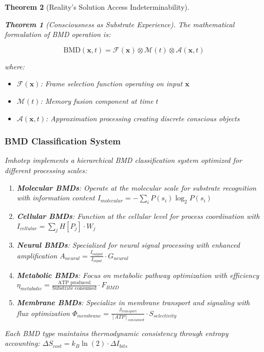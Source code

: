 \documentclass[12pt,a4paper]{article}
\newtheorem{theorem}{Theorem}[section]
\theoremstyle{remark}
\begin{document}
\begin{theorem}[Reality's Solution Access Indeterminability]
\begin{theorem}[Consciousness as Substrate Experience]
The mathematical formulation of BMD operation is:

\begin{equation}
\text{BMD}(\mathbf{x}, t) = \mathcal{F}(\mathbf{x}) \otimes \mathcal{M}(t) \otimes \mathcal{A}(\mathbf{x}, t)
\end{equation}

where:
\begin{itemize}
\item $\mathcal{F}(\mathbf{x})$: Frame selection function operating on input $\mathbf{x}$
\item $\mathcal{M}(t)$: Memory fusion component at time $t$
\item $\mathcal{A}(\mathbf{x}, t)$: Approximation processing creating discrete conscious objects
\end{itemize}

\subsubsection{BMD Classification System}

Imhotep implements a hierarchical BMD classification system optimized for different processing scales:

\begin{enumerate}
\item \textbf{Molecular BMDs}: Operate at the molecular scale for substrate recognition with information content $I_{molecular} = -\sum_i P(s_i) \log_2 P(s_i)$
\item \textbf{Cellular BMDs}: Function at the cellular level for process coordination with $I_{cellular} = \sum_j H[P_j] \cdot W_j$
\item \textbf{Neural BMDs}: Specialized for neural signal processing with enhanced amplification $A_{neural} = \frac{I_{output}}{I_{input}} \cdot G_{neural}$
\item \textbf{Metabolic BMDs}: Focus on metabolic pathway optimization with efficiency $\eta_{metabolic} = \frac{\text{ATP produced}}{\text{Substrate consumed}} \cdot F_{BMD}$
\item \textbf{Membrane BMDs}: Specialize in membrane transport and signaling with flux optimization $\Phi_{membrane} = \frac{J_{transport}}{[ATP]_{consumed}} \cdot S_{selectivity}$
\end{enumerate}

Each BMD type maintains thermodynamic consistency through entropy accounting: $\Delta S_{cost} = k_B \ln(2) \cdot \Delta I_{bits}$


\end{theorem}
\end{theorem}
\end{document}
